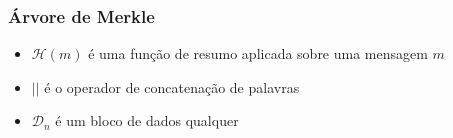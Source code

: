 \documentclass{beamer}
\newcommand{\concat}{\, \vert \vert \,}
\begin{document}
\begin{frame}
  \frametitle{Árvore de Merkle \cite{Merkle1982}}
  \begin{itemize}
    \item $\mathcal{H}(m)$ é uma função de resumo aplicada sobre uma
      mensagem $m$
    \item $\vert \vert$ é o operador de concatenação de palavras
    \item $\mathcal{D}_{n}$ é um bloco de dados qualquer
  \end{itemize}

  \begin{figure}
  \end{figure}
\end{frame}
\end{document}
